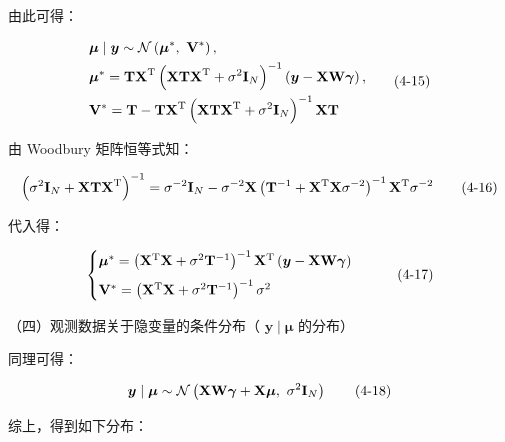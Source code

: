 \documentclass[12pt,a4paper]{ctexart}
\makeatletter
\numberwithin{figure}{section}
\numberwithin{table}{section}
\let\ltx@orig@tag\tag
\renewcommand{\tag}[1]{\refstepcounter{equation}\ltx@orig@tag{#1}}%
\makeatother
\begin{document}
由此可得：

\begin{equation}
\begin{aligned}
&\boldsymbol{\mu}\mid\boldsymbol{y}\sim\mathcal{N}\left(\boldsymbol{\mu}^{*},\ \mathbf{V}^{*}\right),\\
&\boldsymbol{\mu}^{*}=\mathbf{TX}^{\mathrm{T}}\left(\mathbf{XTX}^{\mathrm{T}}+\sigma^{2}\mathbf{I}_{N}\right)^{-1}\left(\boldsymbol{y}-\mathbf{XW}\boldsymbol{\gamma}\right),\\
&\mathbf{V}^{*}=\mathbf{T}-\mathbf{TX}^{\mathrm{T}}\left(\mathbf{XTX}^{\mathrm{T}}+\sigma^{2}\mathbf{I}_{N}\right)^{-1}\mathbf{XT}
\end{aligned} \tag{4-15}
\end{equation}

由 Woodbury 矩阵恒等式知：

\begin{equation}
\left(\sigma^{2}\mathbf{I}_{N}+\mathbf{XTX}^{\mathrm{T}}\right)^{-1}=\sigma^{-2}\mathbf{I}_{N}-\sigma^{-2}\mathbf{X}\left(\mathbf{T}^{-1}+\mathbf{X}^{\mathrm{T}}\mathbf{X}\sigma^{-2}\right)^{-1}\mathbf{X}^{\mathrm{T}}\sigma^{-2} \tag{4-16}
\end{equation}

代入得：

\begin{equation}
\begin{cases}
\boldsymbol{\mu}^{*}=\left(\mathbf{X}^{\mathrm{T}}\mathbf{X}+\sigma^{2}\mathbf{T}^{-1}\right)^{-1}\mathbf{X}^{\mathrm{T}}\left(\boldsymbol{y}-\mathbf{XW}\boldsymbol{\gamma}\right)\\[6pt]
\mathbf{V}^{*}=\left(\mathbf{X}^{\mathrm{T}}\mathbf{X}+\sigma^{2}\mathbf{T}^{-1}\right)^{-1}\sigma^{2}
\end{cases} \tag{4-17}
\end{equation}

（四）观测数据关于隐变量的条件分布（ $\boldsymbol{y}\mid\boldsymbol{\mu}$ 的分布）

同理可得：

\begin{equation}
\boldsymbol{y}\mid\boldsymbol{\mu}\sim\mathcal{N}\left(\mathbf{XW}\boldsymbol{\gamma}+\mathbf{X}\boldsymbol{\mu},\ \sigma^{2}\mathbf{I}_{N}\right) \tag{4-18}
\end{equation}

综上，得到如下分布：
\end{document}
